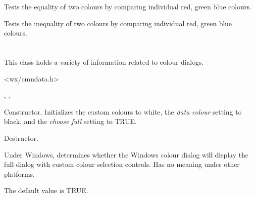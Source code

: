 
Tests the equality of two colours by comparing individual red, green blue colours.

\label{wxcolourinequality}


Tests the inequality of two colours by comparing individual red, green blue colours.

\section{}\label{wxcolourdata}

This class holds a variety of information related to colour dialogs.




<wx/cmndata.h>


, , 


\label{wxcolourdataconstr}


Constructor. Initializes the custom colours to white, the {\it data colour} setting
to black, and the {\it choose full} setting to TRUE.



Destructor.

\label{wxcolourdatagetchoosefull}


Under Windows, determines whether the Windows colour dialog will display the full dialog
with custom colour selection controls. Has no meaning under other platforms.

The default value is TRUE.

\label{wxcolourdatagetcolour}


